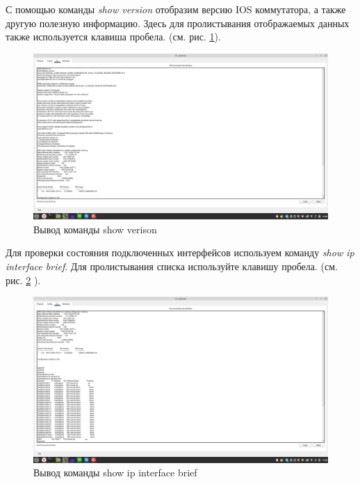 \documentclass[a4paper,14pt]{extarticle}
\begin{document}
С помощью команды\textit{ show version} отобразим версию IOS коммутатора, а также другую полезную
информацию. Здесь для пролистывания отображаемых данных также используется клавиша пробела. (см. рис. \ref{fig:version-listitng}).
\begin{figure}[h!]
	\centering
	\includegraphics[width=0.7\linewidth]{images/version-listitng}
	\caption{Вывод команды show verison}
	\label{fig:version-listitng}
\end{figure}

Для проверки состояния подключенных интерфейсов используем команду \textit{show ip interface brief}. Для
пролистывания списка используйте клавишу пробела. (см. рис. \ref{fig:interface-listing} ).

\begin{figure}[h!]
	\centering
	\includegraphics[width=0.7\linewidth]{images/interface-listing}
	\caption{Вывод команды show ip interface brief }
	\label{fig:interface-listing}
\end{figure}
\end{document}

